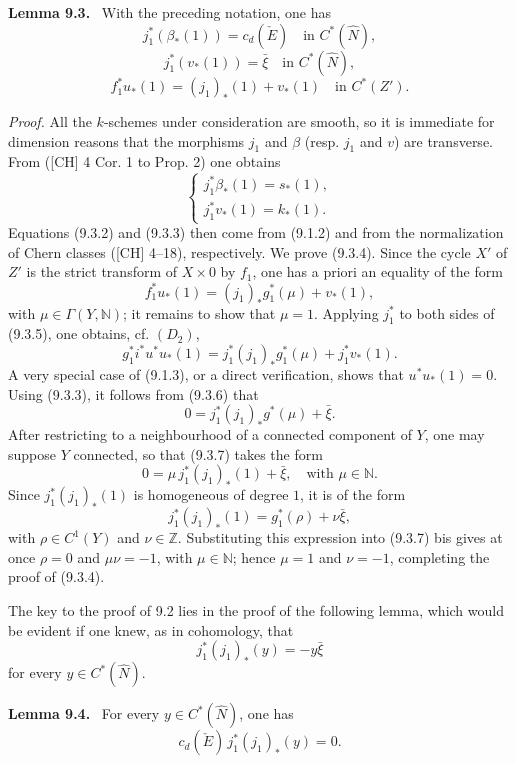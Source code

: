 \documentclass[11pt]{article}
\newenvironment{statement}[1]{\par\medskip\noindent\textbf{#1.}\ }{\par\medskip}
\begin{document}
\begin{statement}{Lemma 9.3}
With the preceding notation, one has
\[
j_1^*(\beta_*(1))=c_d(\check E)\quad\text{in }C^*(\widehat N),
\tag{9.3.2}
\]
\[
j_1^*(v_*(1))=\bar\xi\quad\text{in }C^*(\widehat N),
\tag{9.3.3}
\]
\[
f_1^*u_*(1)=(j_1)_*(1)+v_*(1)\quad\text{in }C^*(Z').
\tag{9.3.4}
\]
\end{statement}

\emph{Proof.} All the $k$-schemes under consideration are smooth, so it is immediate for dimension reasons that the morphisms $j_1$ and $\beta$ (resp. $j_1$ and $v$) are transverse. From ([CH] 4 Cor. 1 to Prop. 2) one obtains
\[
\begin{cases}
j_1^*\beta_*(1)=s_*(1),\\
j_1^*v_*(1)=k_*(1).
\end{cases}
\]
Equations (9.3.2) and (9.3.3) then come from (9.1.2) and from the normalization of Chern classes ([CH] 4--18), respectively. We prove (9.3.4). Since the cycle $X'$ of $Z'$ is the strict transform of $X\times0$ by $f_1$, one has a priori an equality of the form
\[
f_1^*u_*(1)=(j_1)_*g_1^*(\mu)+v_*(1),
\tag{9.3.5}
\]
with $\mu\in\Gamma(Y,\mathbb N)$; it remains to show that $\mu=1$. Applying $j_1^*$ to both sides of (9.3.5), one obtains, cf. $(D_2)$,
\[
g_1^*i^*u^*u_*(1)=j_1^*(j_1)_*g_1^*(\mu)+j_1^*v_*(1).
\tag{9.3.6}
\]
A very special case of (9.1.3), or a direct verification, shows that $u^*u_*(1)=0$. Using (9.3.3), it follows from (9.3.6) that
\[
0=j_1^*(j_1)_*g^*(\mu)+\bar\xi.
\tag{9.3.7}
\]
After restricting to a neighbourhood of a connected component of $Y$, one may suppose $Y$ connected, so that (9.3.7) takes the form
\[
0=\mu\,j_1^*(j_1)_*(1)+\bar\xi,\quad\text{with }\mu\in\mathbb N.
\tag{9.3.7 bis}
\]
Since $j_1^*(j_1)_*(1)$ is homogeneous of degree $1$, it is of the form
\[
j_1^*(j_1)_*(1)=g_1^*(\rho)+\nu\bar\xi,
\]
with $\rho\in C^1(Y)$ and $\nu\in\mathbb Z$. Substituting this expression into (9.3.7) bis gives at once $\rho=0$ and $\mu\nu=-1$, with $\mu\in\mathbb N$; hence $\mu=1$ and $\nu=-1$, completing the proof of (9.3.4).

The key to the proof of 9.2 lies in the proof of the following lemma, which would be evident if one knew, as in cohomology, that
\[
j_1^*(j_1)_*(y)=-y\bar\xi
\]
for every $y\in C^*(\widehat N)$.

\begin{statement}{Lemma 9.4}
For every $y\in C^*(\widehat N)$, one has
\[
c_d(\check E)\,j_1^*(j_1)_*(y)=0.
\]
\end{statement}
\end{document}
